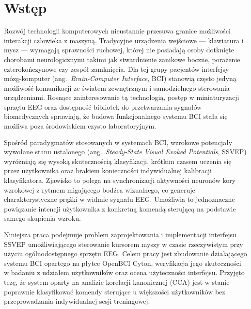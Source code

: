 %


\chapter*{Wstęp}

Rozwój technologii komputerowych nieustannie przesuwa granice możliwości
interakcji człowieka z maszyną. Tradycyjne urządzenia wejściowe ---
klawiatura i mysz --- wymagają sprawności ruchowej, której nie posiadają
osoby dotknięte chorobami neurologicznymi takimi jak stwardnienie zanikowe
boczne, porażenie czterokończynowe czy zespół zamknięcia. Dla tej grupy
pacjentów interfejsy mózg-komputer (ang.~\textit{Brain-Computer Interface},
BCI) stanowią często jedyną możliwość komunikacji ze światem zewnętrznym
i samodzielnego sterowania urządzeniami. Rosnące zainteresowanie tą
technologią, postęp w miniaturyzacji sprzętu EEG oraz dostępność
bibliotek do przetwarzania sygnałów biomedycznych sprawiają, że budowa
funkcjonalnego systemu BCI stała się możliwa poza środowiskiem czysto
laboratoryjnym.

Spośród paradygmatów stosowanych w systemach BCI, wzrokowe potencjały
wywołane stanu ustalonego (ang.~\textit{Steady-State Visual Evoked
Potentials}, SSVEP) wyróżniają się wysoką skutecznością klasyfikacji,
krótkim czasem uczenia się przez użytkownika oraz brakiem konieczności
indywidualnej kalibracji klasyfikatora. Zjawisko to polega na
synchronizacji aktywności neuronów kory wzrokowej z rytmem migającego
bodźca wizualnego, co generuje charakterystyczne prążki w widmie sygnału
EEG. Umożliwia to jednoznaczne powiązanie intencji użytkownika
z konkretną komendą sterującą na podstawie samego skupienia wzroku.

Niniejsza praca podejmuje problem zaprojektowania i implementacji
interfejsu SSVEP umożliwiającego sterowanie kursorem myszy w czasie
rzeczywistym przy użyciu ogólnodostępnego sprzętu EEG. Celem pracy
jest zbudowanie działającego systemu BCI opartego na płytce OpenBCI
Cyton, weryfikacja jego skuteczności w badaniu z udziałem użytkowników
oraz ocena użyteczności interfejsu. Przyjęto tezę, że system oparty
na analizie korelacji kanonicznej (CCA) jest w stanie poprawnie
klasyfikować komendy sterujące u większości użytkowników bez
przeprowadzania indywidualnej sesji treningowej.

